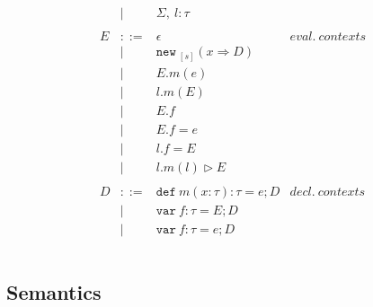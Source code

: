 \documentclass{llncs}
\newcommand{\keywadj}[1]{\mathtt{#1}}
\newcommand{\keyw}[1]{\keywadj{#1}~}
\begin{document}
\[\begin{array}{lll}
\begin{array}{lllr}
& | & \Sigma,~l : \tau\\
&&\\
E & ::= & \epsilon & eval.~ contexts\\
  & |   & \keyw{new}_{[s]}(x \Rightarrow D) \\
  & |   & E.m(e)\\
  & |   & l.m(E)\\
  & |   & E.f \\
  & |   & E.f = e \\
  & |   & l.f = E \\
  & |   & l.m(l) \rhd E \\
&&\\
D & ::= & \keyw{def} m(x:\tau):\tau = e; D & decl.~ contexts\\
  & |   & \keyw{var} f:\tau = E; D \\
  & |   & \keyw{var} f:\tau = e; D \\
&&\\
\end{array}
\end{array}
\]

\newpage

\subsection{Semantics}
\end{document}
